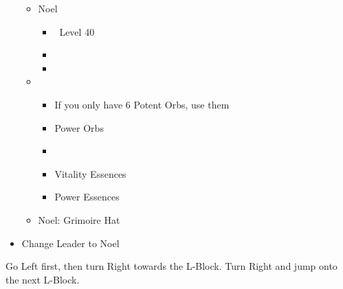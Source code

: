 \begin{menu}
	\begin{itemize}
		\crystarium
		\begin{itemize}
			\item Noel
			      \begin{itemize}
				      \item \sen\ Level 40
				      \item {}
				      \item {}
			      \end{itemize}
			\item \chu
			      \begin{itemize}
				      \item If you only have 6 Potent Orbs, use them
				      \item Power Orbs
				      \item {}
				      \item Vitality Essences
				      \item Power Essences
			      \end{itemize}
		\end{itemize}
		\equip
		\begin{itemize}
			\item Noel: Grimoire Hat
		\end{itemize}
	\item Change Leader to Noel
	\end{itemize}
\end{menu}

Go Left first, then turn Right towards the L-Block. Turn Right and jump onto the next L-Block.


